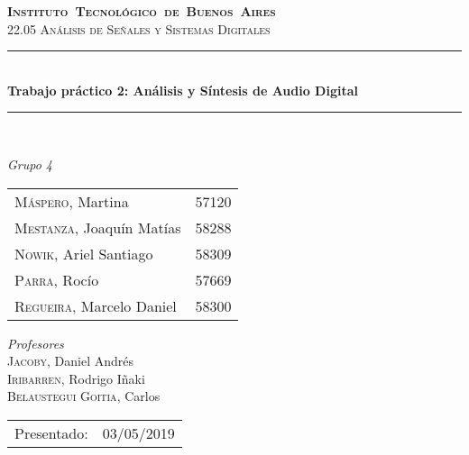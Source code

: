\begin{titlepage}
\newcommand{\HRule}{\rule{\linewidth}{0.5mm}}
\center
\mbox{\textsc{\LARGE \bfseries {Instituto Tecnol\'ogico de Buenos Aires}}}\\[1.5cm]
\textsc{\Large 22.05 An\'alisis de Se\~nales y Sistemas Digitales}\\[0.5cm]


\HRule \\[0.6cm]
{ \Huge \bfseries Trabajo pr\'actico 2: An\'alisis y S\'intesis de Audio Digital}\\[0.4cm] %
\HRule \\[1.5cm]


{\large

\emph{Grupo 4}\\
\vspace{3px}

\begin{tabular}{lr} 	
\textsc{M\'aspero}, Martina  & 57120 \\
\textsc{Mestanza}, Joaqu\'in Mat\'ias  & 58288 \\
\textsc{Nowik}, Ariel Santiago  & 58309 \\
\textsc{Parra}, Roc\'io  & 57669 \\
\textsc{Regueira}, Marcelo Daniel  & 58300 \\
\end{tabular}

\vspace{20px}

\emph{Profesores}\\
\vspace{3px}
\textsc{Jacoby}, Daniel Andr\'es\\ 	
\textsc{Iribarren}, Rodrigo I\~naki\\ 	
\textsc{Belaustegui Goitia}, Carlos\\ 	

\vspace{100px}

\begin{tabular}{ll}

Presentado: & 03/05/2019\\

\end{tabular}

}

\vfill

\end{titlepage}